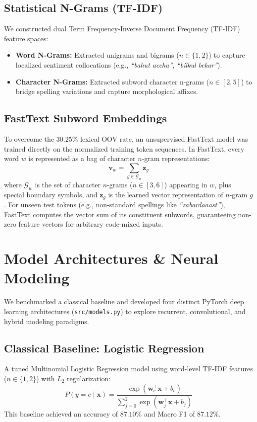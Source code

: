 \documentclass[11pt,a4paper]{article}
\begin{document}
\subsection{Statistical N-Grams (TF-IDF)}
We constructed dual Term Frequency-Inverse Document Frequency (TF-IDF) feature spaces:
\begin{itemize}
    \item \textbf{Word N-Grams:} Extracted unigrams and bigrams ($n \in \{1, 2\}$) to capture localized sentiment collocations (e.g., \textit{``bahut accha''}, \textit{``bilkul bekar''}).
    \item \textbf{Character N-Grams:} Extracted subword character n-grams ($n \in [2, 5]$) to bridge spelling variations and capture morphological affixes.
\end{itemize}

\subsection{FastText Subword Embeddings}
To overcome the $30.25\%$ lexical OOV rate, an unsupervised FastText model was trained directly on the normalized training token sequences. In FastText, every word $w$ is represented as a bag of character $n$-gram representations:
\begin{equation}
    \mathbf{v}_w = \sum_{g \in \mathcal{G}_w} \mathbf{z}_g
\end{equation}
where $\mathcal{G}_w$ is the set of character $n$-grams ($n \in [3, 6]$) appearing in $w$, plus special boundary symbols, and $\mathbf{z}_g$ is the learned vector representation of $n$-gram $g$. For unseen test tokens (e.g., non-standard spellings like \textit{``zabardaaast''}), FastText computes the vector sum of its constituent subwords, guaranteeing non-zero feature vectors for arbitrary code-mixed inputs.

\section{Model Architectures \& Neural Modeling}

We benchmarked a classical baseline and developed four distinct PyTorch deep learning architectures (\texttt{src/models.py}) to explore recurrent, convolutional, and hybrid modeling paradigms.

\subsection{Classical Baseline: Logistic Regression}
A tuned Multinomial Logistic Regression model using word-level TF-IDF features ($n \in \{1, 2\}$) with $L_2$ regularization:
\begin{equation}
    P(y = c \mid \mathbf{x}) = \frac{\exp(\mathbf{w}_c^\top \mathbf{x} + b_c)}{\sum_{j=0}^2 \exp(\mathbf{w}_j^\top \mathbf{x} + b_j)}
\end{equation}
This baseline achieved an accuracy of $87.10\%$ and Macro F1 of $87.12\%$.
\end{document}
